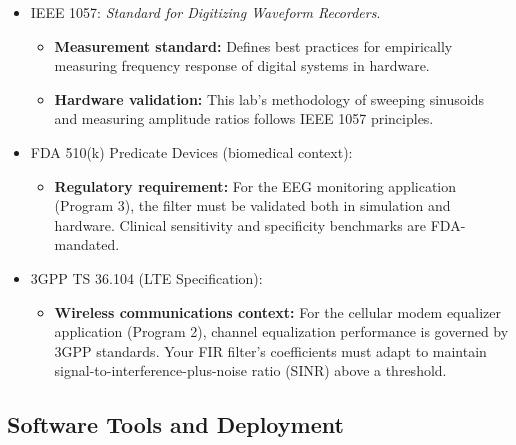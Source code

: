 \documentclass[11pt,letterpaper]{article}
\begin{document}
\begin{itemize}
    \item IEEE 1057: \textit{Standard for Digitizing Waveform Recorders}.
    \begin{itemize}
        \item \textbf{Measurement standard:} Defines best practices for empirically measuring frequency response of digital systems in hardware.
        \item \textbf{Hardware validation:} This lab's methodology of sweeping sinusoids and measuring amplitude ratios follows IEEE 1057 principles.
    \end{itemize}

    \item FDA 510(k) Predicate Devices (biomedical context):
    \begin{itemize}
        \item \textbf{Regulatory requirement:} For the EEG monitoring application (Program 3), the filter must be validated both in simulation and hardware. Clinical sensitivity and specificity benchmarks are FDA-mandated.
    \end{itemize}

    \item 3GPP TS 36.104 (LTE Specification):
    \begin{itemize}
        \item \textbf{Wireless communications context:} For the cellular modem equalizer application (Program 2), channel equalization performance is governed by 3GPP standards. Your FIR filter's coefficients must adapt to maintain signal-to-interference-plus-noise ratio (SINR) above a threshold.
    \end{itemize}
\end{itemize}

\subsection*{Software Tools and Deployment}
\end{document}
